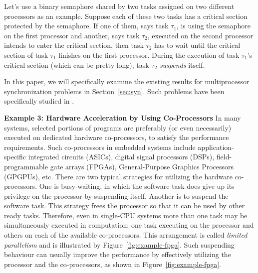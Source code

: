 Let's use a binary semaphore shared by two tasks assigned on two different processors as an example. Suppose each of these two tasks has a critical section protected by the semaphore. If one of them, says task $\tau_1$, is using the semaphore on the first processor and another, says task $\tau_2$, executed on the second processor intends to enter the critical section, then task $\tau_2$ has to wait until the critical section of task $\tau_1$ finishes on the first processor. During the execution of task $\tau_1$'s critical section (which can be pretty long), task $\tau_2$ \emph{suspends} itself. 


In this paper, we will specifically examine the existing results for multiprocessor synchronization problems in Section~\ref{sec:syn}. Such problems have been specifically studied in \cite{rajkumar-1990,lakshmanan-2009,zeng-2011,bbb-2013,yang-2013,kim-2014,han-2014,carminati-2014,yang-2014}.

{\bf Example 3: Hardware Acceleration by Using Co-Processors} In many systems, selected portions of programs are preferably (or even necessarily) executed on dedicated hardware co-processors, to satisfy the performance requirements.  Such co-processors in embedded systems include application-specific integrated circuits (ASICs), digital signal processors (DSPs), field-programmable gate arrays (FPGAs), General-Purpose Graphics Processors (GPGPUs), etc. There are two typical strategies for utilizing the hardware co-processors. One is busy-waiting, in which the software task does give up its privilege on the processor by suspending itself. Another is to suspend the software task. This strategy frees the processor so that it can be used by other ready tasks. Therefore, even in single-CPU systems more than one task may be simultaneously executed in computation: one task executing on the processor and others on each of the available co-processors. This arrangement is called \emph{limited parallelism} \cite{RTAS-AudsleyB04} and is illustrated by Figure~\ref{fig:example-fpga}. Such suspending behaviour can usually improve the performance by effectively utilizing the processor and the co-processors, as shown in Figure~\ref{fig:example-fpga}.

